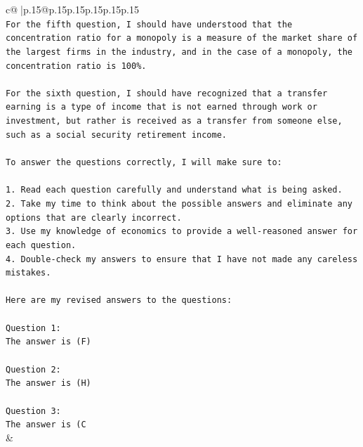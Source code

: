 \documentclass{article}
\begin{document}
{\begin{supertabular}{c@{$\;$}|p{.15\linewidth}@{}p{.15\linewidth}p{.15\linewidth}p{.15\linewidth}p{.15\linewidth}p{.15\linewidth}}
{{{\\ 
\texttt{For the fifth question, I should have understood that the concentration ratio for a monopoly is a measure of the market share of the largest firms in the industry, and in the case of a monopoly, the concentration ratio is 100\%.} \\
\\ 
\texttt{For the sixth question, I should have recognized that a transfer earning is a type of income that is not earned through work or investment, but rather is received as a transfer from someone else, such as a social security retirement income.} \\
\\ 
\texttt{To answer the questions correctly, I will make sure to:} \\
\\ 
\texttt{1. Read each question carefully and understand what is being asked.} \\
\texttt{2. Take my time to think about the possible answers and eliminate any options that are clearly incorrect.} \\
\texttt{3. Use my knowledge of economics to provide a well{-}reasoned answer for each question.} \\
\texttt{4. Double{-}check my answers to ensure that I have not made any careless mistakes.} \\
\\ 
\texttt{Here are my revised answers to the questions:} \\
\\ 
\texttt{Question 1:} \\
\texttt{The answer is (F)} \\
\\ 
\texttt{Question 2:} \\
\texttt{The answer is (H)} \\
\\ 
\texttt{Question 3:} \\
\texttt{The answer is (C} \\
            }
        }
    }
    & \\ \\

\end{supertabular}
}
\end{document}
